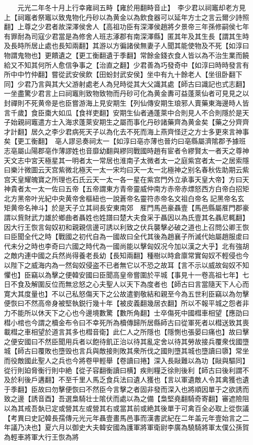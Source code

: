 　　元光二年冬十月上行幸雍祠五畤【雍於用翻畤音止】　李少君以祠竈却老方見上【祠竈者祭竈以致鬼物化丹砂以為黄金以為飲食器可以延年方士之言云爾少詩照翻】上尊之少君者故深澤侯舍人【高祖功臣有深澤侯趙將夕景帝三年孫修嗣侯七年有罪耐為司寇少君當是為修舍人班志涿郡有南深澤縣】匿其年及其生長【謂其生時及長時所居止處也長知兩翻】其游以方徧諸侯無妻子人聞其能使物及不死【如淳曰物謂鬼物也】更饋遺之【更工衡翻遺于季翻】常餘金錢衣食人皆以為不治生業而饒給又不知其何所人愈信争事之【治直之翻】少君善為巧發奇中【如淳曰時時發言有所中中竹仲翻】嘗從武安侯飲【田蚡封武安侯】坐中有九十餘老人【坐徂卧翻下同】少君乃言與其大父游射處老人為兒時從其大父識其處【師古曰識記也式志翻】一坐盡驚少君言上曰祠竈則致物致物而丹砂可化為黄金夀可益蓬萊仙者可見見之以封禪則不死黄帝是也臣嘗游海上見安期生【列仙傳安期生琅邪人賣藥東海邊時人皆言千歲】食臣棗大如瓜【食祥吏翻】安期生仙者通蓬萊中合則見人不合則隱於是天子始親祠竈遣方士入海求蓬萊安期生之屬而事化丹砂諸藥齊為黄金矣【藥之分齊齊才計翻】居久之李少君病死天子以為化去不死而海上燕齊怪迂之方士多更來言神事矣【更工衡翻】　亳人謬忌奏祠太一【如淳曰亳亦薄也晉灼曰亳縣屬濟隂郡予據班志亳屬山陽郡亳作薄謬姓也音靡幼翻與繆同戰國時趙有宦者令繆賢太一者天之尊神天文志中宮天極星其一明者太一常居也淮南子太微者太一之庭紫宫者太一之居索隱曰樂汁微圖云天宫紫微北極天一太一宋均曰天一太一北極神之别名春秋佐助期云紫宫天皇耀魄寶之所理也石氏云天一太一各一星在紫宫門外立承事天皇大帝】方曰天神貴者太一太一佐曰五帝【五帝謂東方青帝靈威仲南方赤帝赤熛怒西方白帝白招矩北方黑帝叶光紀中央黄帝舍樞紐也一說蒼帝名靈符赤帝名文祖白帝名記黑帝名玄矩黄帝名神斗】於是天子立其祠長安東南郊　㕍門馬邑豪聶壹【馬邑縣屬㕍門郡豪謂以貲財武力雄於鄉曲者聶姓也姓譜曰楚大夫食采于聶因以為氏壹其名聶尼輒翻】因大行王恢言匈奴初和親親信邊可誘以利致之伏兵襲擊必破之道也上召問公卿王恢曰臣聞全代之時【戰國之初代自為一國故曰全代其後為趙襄子所滅代始屬趙服䖍曰代未分之時也李奇曰六國之時代為一國尚能以擊匈奴况今加以漢之大乎】北有強胡之敵内連中國之兵然尚得養老長幼【長知兩翻】種樹以時倉廪常實匈奴不輕侵也今以陛下之威海内為一然匈奴侵盗不已者無它以不恐之故耳【言不示以威故匈奴不知懼也】臣竊以為擊之便韓安國曰臣聞高皇帝嘗圍於平城【事見十一卷高祖七年】七日不食及解圍反位而無忿怒之心夫聖人以天下為度者也【師古曰言當隨天下人心而寛大其度量也】不以己私怒傷天下之公故遣劉敬結和親至今為五世利臣竊以為勿擊便恢曰不然高帝身被堅執鋭行幾十年【被皮義翻幾居衣翻】所以不報平城之怨者非力不能所以休天下之心也今邊境數驚【數所角翻】士卒傷死中國槥車相望【應劭曰槥小棺也今謂之櫝金布令曰不幸死所為櫝傳歸所居縣師古曰從軍死者以槥送致其喪載槥之車相望於道言其多也槥音衛】此仁人之所隱也【隱惻也張晏曰痛也】故曰擊之便安國曰不然臣聞用兵者以飽待飢正治以待其亂定舍以待其勞故接兵覆衆伐國墮城【師古曰覆敗也墮毁也言兵與敵接則敗其衆所伐之國則墮其城也墮讀曰隳】常坐而役敵國此聖人之兵也今將卷甲輕舉【卷讀曰捲】深入長敺難以為功【敺與驅同】從行則廹脅衡行則中絶【從子容翻衡讀曰横】疾則糧乏徐則後利【師古曰後利謂不及於利後戶遘翻】不至千里人馬乏食兵法曰遺人獲也【言以軍遺敵人令其禽獲也遺于季翻】臣故曰勿擊便恢曰不然臣今言擊之者固非發而深入也將順因單于之欲誘而致之邊【誘音酉】吾選梟騎壮士隂伏而處以為之備【梟堅堯翻騎奇寄翻】審遮險阻以為其戒吾埶已定或營其左或營其右或當其前或絶其後單于可禽百全必取上從恢議　【考異曰史記韓長孺傳元光元年聶壹畫馬邑事而漢書武紀在二年盖元年壹始言之二年議乃决也】夏六月以御史大夫韓安國為護軍將軍衛尉李廣為驍騎將軍太僕公孫賀為輕車將軍大行王恢為將